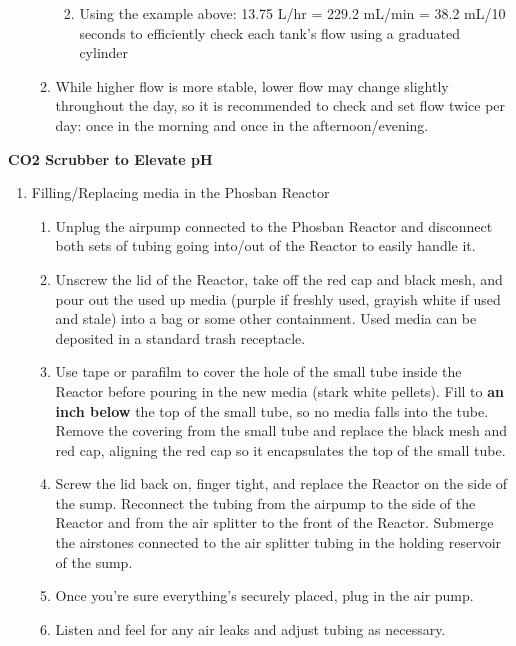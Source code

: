 \documentclass[
]{book}
\providecommand{\tightlist}{%
  \setlength{\itemsep}{0pt}\setlength{\parskip}{0pt}}
\begin{document}
\begin{enumerate}
\begin{enumerate}
    \begin{enumerate}
    \def\labelenumiii{\arabic{enumiii}.}
    \tightlist
    \item
      Using the example above: 13.75 L/hr = 229.2 mL/min = 38.2 mL/10 seconds to efficiently check each tank's flow using a graduated cylinder
    \end{enumerate}
  \item
    While higher flow is more stable, lower flow may change slightly throughout the day, so it is recommended to check and set flow twice per day: once in the morning and once in the afternoon/evening.
  \end{enumerate}
\end{enumerate}

\textbf{CO2 Scrubber to Elevate pH}

\begin{enumerate}
\def\labelenumi{\arabic{enumi}.}
\tightlist
\item
  Filling/Replacing media in the Phosban Reactor

  \begin{enumerate}
  \def\labelenumii{\arabic{enumii}.}
  \tightlist
  \item
    Unplug the airpump connected to the Phosban Reactor and disconnect both sets of tubing going into/out of the Reactor to easily handle it.
  \item
    Unscrew the lid of the Reactor, take off the red cap and black mesh, and pour out the used up media (purple if freshly used, grayish white if used and stale) into a bag or some other containment. Used media can be deposited in a standard trash receptacle.
  \item
    Use tape or parafilm to cover the hole of the small tube inside the Reactor before pouring in the new media (stark white pellets). Fill to \textbf{an inch below} the top of the small tube, so no media falls into the tube. Remove the covering from the small tube and replace the black mesh and red cap, aligning the red cap so it encapsulates the top of the small tube.
  \item
    Screw the lid back on, finger tight, and replace the Reactor on the side of the sump. Reconnect the tubing from the airpump to the side of the Reactor and from the air splitter to the front of the Reactor. Submerge the airstones connected to the air splitter tubing in the holding reservoir of the sump.
  \item
    Once you're sure everything's securely placed, plug in the air pump.
  \item
    Listen and feel for any air leaks and adjust tubing as necessary.
  \end{enumerate}
\end{enumerate}
\end{document}
